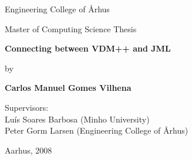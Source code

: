 

\pagestyle{empty}
\sffamily

\noindent
\begin{center}
    \Large Engineering College of \AA rhus
\end{center}

\vfill\vfill
\begin{center}
    \large
    Master of Computing Science Thesis\\
\end{center}

\vfill
\begin{center}
    \Huge\bfseries Connecting between VDM++ and JML
\end{center}

\vfill
\begin{center}
    \Large
    by
\end{center}

\vfill
\begin{center}
    \huge\bfseries Carlos Manuel Gomes Vilhena
\end{center}

\vfill\vfill\vfill
\begin{center}
    \Large
    Supervisors:\\
    Lu\'{i}s Soares Barbosa (Minho University)\\
    Peter Gorm Larsen (Engineering College of \AA rhus)
\end{center}

\vfill
\begin{center}
\large
    Aarhus, 2008
\end{center}

\cleardoublepage



\thispagestyle{empty}
\clearpage



\cleardoublepage

\pagestyle{headings}
\tableofcontents



